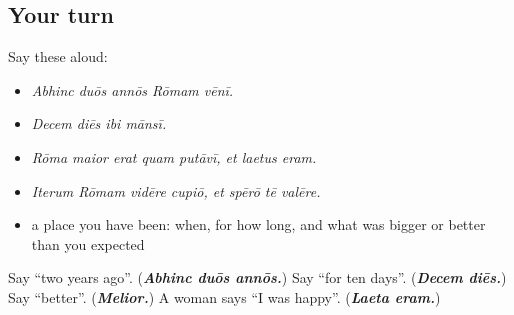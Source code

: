 \subsection*{Your turn}
Say these aloud:

\begin{itemize}
\raggedright
  \item \emph{Abhinc duōs annōs Rōmam vēnī.}
  \item \emph{Decem diēs ibi mānsī.}
  \item \emph{Rōma maior erat quam putāvī, et laetus eram.}
  \item \emph{Iterum Rōmam vidēre cupiō, et spērō tē valēre.}
  \item a place you have been: when, for how long, and what was bigger or better than you expected
\end{itemize}

\begin{tcolorbox}[breakable,colback=teal!4,colframe=teal!35!black,title={Before you move on}]
Say \textquotedblleft{}two years ago\textquotedblright{}. (\emph{\textbf{Abhinc duōs annōs.}}) Say \textquotedblleft{}for ten days\textquotedblright{}. (\emph{\textbf{Decem diēs.}}) Say \textquotedblleft{}better\textquotedblright{}. (\emph{\textbf{Melior.}}) A woman says \textquotedblleft{}I was happy\textquotedblright{}. (\emph{\textbf{Laeta eram.}})
\end{tcolorbox}
